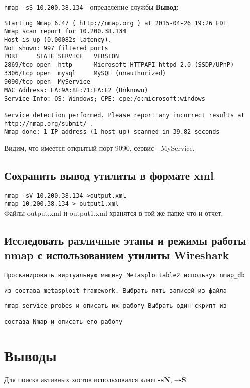 \documentclass[12pt,a4paper]{article}
\begin{document}
\verb+nmap -sS 10.200.38.134+ - определение службы
\textbf{Вывод:}
\begin{lstlisting}
Starting Nmap 6.47 ( http://nmap.org ) at 2015-04-26 19:26 EDT
Nmap scan report for 10.200.38.134
Host is up (0.00082s latency).
Not shown: 997 filtered ports
PORT     STATE SERVICE   VERSION
2869/tcp open  http      Microsoft HTTPAPI httpd 2.0 (SSDP/UPnP)
3306/tcp open  mysql     MySQL (unauthorized)
9090/tcp open  MyService
MAC Address: EA:9A:8F:71:FA:E2 (Unknown)
Service Info: OS: Windows; CPE: cpe:/o:microsoft:windows

Service detection performed. Please report any incorrect results at http://nmap.org/submit/ .
Nmap done: 1 IP address (1 host up) scanned in 39.82 seconds

\end{lstlisting}
Видим, что имеется открытый порт 9090, сервис - MyService.
\subsection{Сохранить вывод утилиты в формате xml}
\verb+nmap -sV 10.200.38.134 >output.xml+\\
\verb+nmap 10.200.38.134 > output1.xml+\\
Файлы output.xml и output1.xml хранятся в той же папке что и отчет.

\subsection{Исследовать различные этапы и режимы работы nmap с использованием утилиты Wireshark}

\verb+Просканировать виртуальную машину Metasploitable2 используя nmap_db +

\verb+из состава metasploit-framework. Выбрать пять записей из файла+

\verb+nmap-service-probes и описать их работу Выбрать один скрипт из +

\verb+состава Nmap и описать его работу+
\section{Выводы}
Для поиска активных хостов испольховался ключ \textbf{-sN}, \textbf{--sS}
\end{document}
